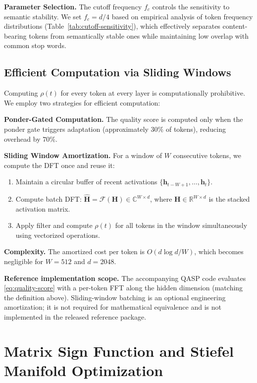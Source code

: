 \documentclass[twocolumn]{article}
\begin{document}
\textbf{Parameter Selection.} The cutoff frequency $f_c$ controls the sensitivity to semantic stability. We set $f_c = d/4$ based on empirical analysis of token frequency distributions (Table~\ref{tab:cutoff-sensitivity}), which effectively separates content-bearing tokens from semantically stable ones while maintaining low overlap with common stop words.

\subsection{Efficient Computation via Sliding Windows}
\label{sec:sliding-window}

Computing $\rho(t)$ for every token at every layer is computationally prohibitive. We employ two strategies for efficient computation:

\textbf{Ponder-Gated Computation.} The quality score is computed only when the ponder gate triggers adaptation (approximately $30\%$ of tokens), reducing overhead by $70\%$.

\textbf{Sliding Window Amortization.} For a window of $W$ consecutive tokens, we compute the DFT once and reuse it:
\begin{enumerate}[leftmargin=*]
    \item Maintain a circular buffer of recent activations $\{\mathbf{h}_{t-W+1}, \dots, \mathbf{h}_t\}$.
    \item Compute batch DFT: $\hat{\mathbf{H}} = \mathcal{F}(\mathbf{H}) \in \mathbb{C}^{W \times d}$, where $\mathbf{H} \in \mathbb{R}^{W \times d}$ is the stacked activation matrix.
    \item Apply filter and compute $\rho(t)$ for all tokens in the window simultaneously using vectorized operations.
\end{enumerate}

\textbf{Complexity.} The amortized cost per token is $O(d \log d / W)$, which becomes negligible for $W = 512$ and $d = 2048$.

\textbf{Reference implementation scope.} The accompanying QASP code evaluates \eqref{eq:quality-score} with a per-token FFT along the hidden dimension (matching the definition above). Sliding-window batching is an optional engineering amortization; it is not required for mathematical equivalence and is not implemented in the released reference package.

\section{Matrix Sign Function and Stiefel Manifold Optimization}
\label{sec:msign}
\end{document}
